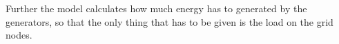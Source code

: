 \documentclass[a4paper]{article}
\begin{document}
Further the model calculates how much energy has to generated by the generators, so that the only thing that has to be given is the load on the grid nodes.

\end{document}
